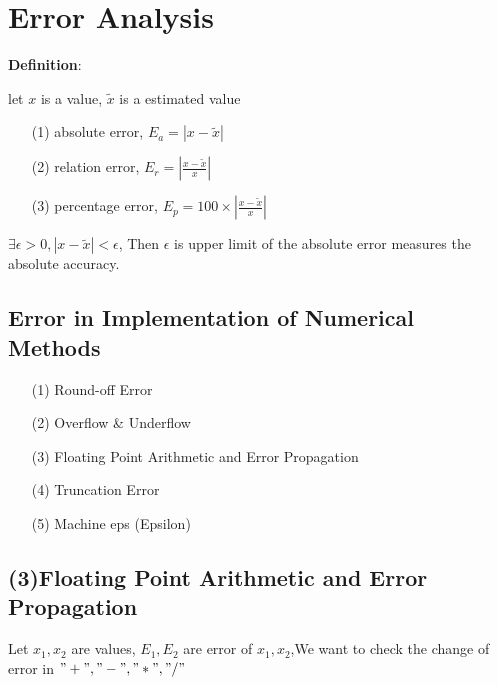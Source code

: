 


\cfoot{\thepage} %

\section{Error Analysis}

\textbf{Definition}:\\
\begin{tcolorbox}

let $x$ is a value, $\tilde{x}$ is a estimated value

\begin{enumerate}
	\item[(1)] absolute   error, $E_a = |x-\tilde{x}|$
	\item[(2)] relation   error, $E_r = |\frac{x-\tilde{x}}{x}|$
	\item[(3)] percentage error, $E_p = 100 \times |\frac{x-\tilde{x}}{x}|$
\end{enumerate}

\end{tcolorbox}

$\exists \epsilon > 0, |x-\tilde{x}| < \epsilon$, Then $\epsilon$ is upper limit of the absolute error measures the absolute accuracy.

\subsection{Error in Implementation of Numerical Methods}

\begin{enumerate}
	\item[(1)] Round-off Error
	\item[(2)] Overflow \& Underflow
	\item[(3)] Floating Point Arithmetic and Error Propagation
	\item[(4)] Truncation Error
	\item[(5)] Machine eps (Epsilon)
\end{enumerate}

\subsection*{(3)Floating Point Arithmetic and Error Propagation}
$ $\\

Let $x_1,x_2$ are values, $E_1,E_2$ are error of $x_1,x_2$,We want to check the change of error in $"+","-","*","/"$

